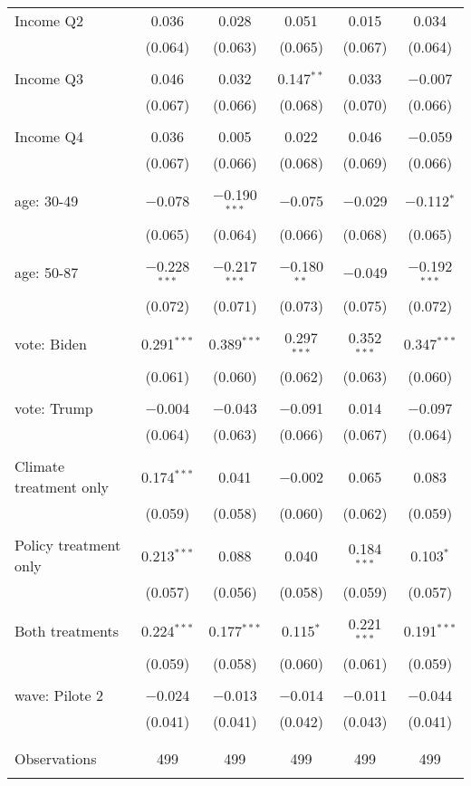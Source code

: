 \begin{tabular}{@{\extracolsep{5pt}}lccccc}
 Income Q2 & 0.036 & 0.028 & 0.051 & 0.015 & 0.034 \\ 
  & (0.064) & (0.063) & (0.065) & (0.067) & (0.064) \\ 
  & & & & & \\ 
 Income Q3 & 0.046 & 0.032 & 0.147$^{**}$ & 0.033 & $-$0.007 \\ 
  & (0.067) & (0.066) & (0.068) & (0.070) & (0.066) \\ 
  & & & & & \\ 
 Income Q4 & 0.036 & 0.005 & 0.022 & 0.046 & $-$0.059 \\ 
  & (0.067) & (0.066) & (0.068) & (0.069) & (0.066) \\ 
  & & & & & \\ 
 age: 30-49 & $-$0.078 & $-$0.190$^{***}$ & $-$0.075 & $-$0.029 & $-$0.112$^{*}$ \\ 
  & (0.065) & (0.064) & (0.066) & (0.068) & (0.065) \\ 
  & & & & & \\ 
 age: 50-87 & $-$0.228$^{***}$ & $-$0.217$^{***}$ & $-$0.180$^{**}$ & $-$0.049 & $-$0.192$^{***}$ \\ 
  & (0.072) & (0.071) & (0.073) & (0.075) & (0.072) \\ 
  & & & & & \\ 
 vote: Biden & 0.291$^{***}$ & 0.389$^{***}$ & 0.297$^{***}$ & 0.352$^{***}$ & 0.347$^{***}$ \\ 
  & (0.061) & (0.060) & (0.062) & (0.063) & (0.060) \\ 
  & & & & & \\ 
 vote: Trump & $-$0.004 & $-$0.043 & $-$0.091 & 0.014 & $-$0.097 \\ 
  & (0.064) & (0.063) & (0.066) & (0.067) & (0.064) \\ 
  & & & & & \\ 
 Climate treatment only & 0.174$^{***}$ & 0.041 & $-$0.002 & 0.065 & 0.083 \\ 
  & (0.059) & (0.058) & (0.060) & (0.062) & (0.059) \\ 
  & & & & & \\ 
 Policy treatment only & 0.213$^{***}$ & 0.088 & 0.040 & 0.184$^{***}$ & 0.103$^{*}$ \\ 
  & (0.057) & (0.056) & (0.058) & (0.059) & (0.057) \\ 
  & & & & & \\ 
 Both treatments & 0.224$^{***}$ & 0.177$^{***}$ & 0.115$^{*}$ & 0.221$^{***}$ & 0.191$^{***}$ \\ 
  & (0.059) & (0.058) & (0.060) & (0.061) & (0.059) \\ 
  & & & & & \\ 
 wave: Pilote 2 & $-$0.024 & $-$0.013 & $-$0.014 & $-$0.011 & $-$0.044 \\ 
  & (0.041) & (0.041) & (0.042) & (0.043) & (0.041) \\ 
  & & & & & \\ 
\hline \\[-1.8ex] 

Observations & 499 & 499 & 499 & 499 & 499 \\ 
\hline 
\hline \\[-1.8ex] 
\end{tabular} 